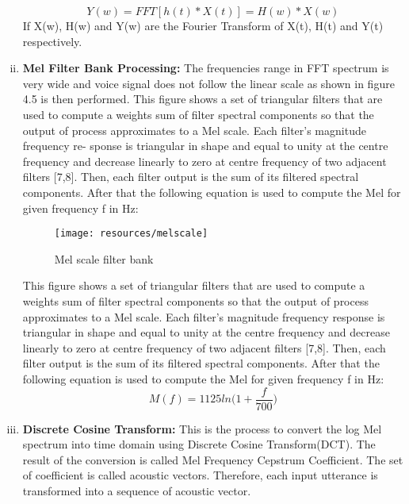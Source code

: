 \begin{enumerate}[(i)]
                \begin{equation}
                        Y(w) = FFT[h(t)*X(t)] = H(w) * X(w)
                \end{equation}
                If X(w), H(w) and Y(w) are the Fourier Transform of X(t), H(t) and Y(t) respectively.
        \item \textbf{Mel Filter Bank Processing:}
                The frequencies range in FFT spectrum is very wide
                and voice signal does not follow the linear scale as shown in figure 4.5 is then
                performed. This figure shows a set of triangular filters that are used to
                compute a weights sum of filter spectral components so that the output of
                process approximates to a Mel scale. Each filter’s magnitude frequency re-
                sponse is triangular in shape and equal to unity at the centre frequency and
                decrease linearly to zero at centre frequency of two adjacent filters [7,8].
                Then, each filter output is the sum of its filtered spectral components. After
                that the following equation is used to compute the Mel for given frequency
                f in Hz:
                \begin{figure}[h!]
                        \centering
                        \texttt{[image: resources/melscale]}
                        \caption{Mel scale filter bank}
                        \label{fig:Melscale}
                \end{figure}
                This figure shows a set of triangular filters that are used to compute a weights sum of filter spectral components so that the output
                of process approximates to a Mel scale. Each filter's magnitude frequency response is triangular in shape and equal to unity at the
                centre frequency and decrease linearly to zero at centre frequency of two adjacent filters [7,8]. Then, each filter output is the sum of its
                filtered spectral components. After that the following equation is used to compute the Mel for given frequency f in Hz:
                \begin{equation}
                        M(f) = 1125ln\Big(1+\frac{f}{700}\Big)
                \end{equation}
        \item \textbf{Discrete Cosine Transform:}
                This is the process to convert the log Mel spectrum into time domain using Discrete Cosine Transform(DCT). The result of the conversion is
                called Mel Frequency Cepstrum Coefficient. The set of coefficient is called acoustic vectors. Therefore, each input utterance is transformed
                into a sequence of acoustic vector.
\end{enumerate}

